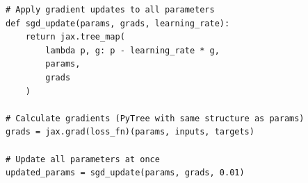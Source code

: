 \begin{frame}[fragile]
    
    \begin{verbatim}
# Apply gradient updates to all parameters
def sgd_update(params, grads, learning_rate):
    return jax.tree_map(
        lambda p, g: p - learning_rate * g, 
        params, 
        grads
    )

# Calculate gradients (PyTree with same structure as params)
grads = jax.grad(loss_fn)(params, inputs, targets)

# Update all parameters at once
updated_params = sgd_update(params, grads, 0.01)    
    \end{verbatim}

\end{frame}





